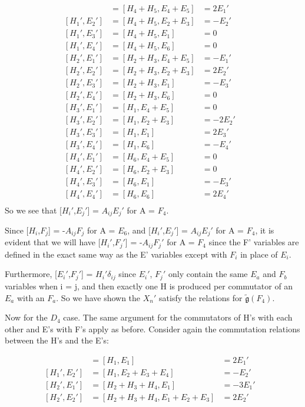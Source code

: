 \documentclass[11pt]{article}
\newcommand{\g}{\ensuremath{\mathfrak{g}}}
\begin{document}
\begin{align*}
[H_1',E_1'] &= [H_4+H_5,E_4+E_5] &= 2E_1'&\\
[H_1',E_2'] &= [H_4+H_5,E_2+E_3] &= -E_2'&\\
[H_1',E_3'] &= [H_4+H_5,E_1] &= 0&\\
[H_1',E_4'] &= [H_4+H_5,E_6] &= 0&\\
[H_2',E_1'] &= [H_2+H_3,E_4+E_5] &= -E_1'&\\
[H_2',E_2'] &= [H_2+H_3,E_2+E_3] &= 2E_2'&\\
[H_2',E_3'] &= [H_2+H_3,E_1] &= -E_3'&\\
[H_2',E_4'] &= [H_2+H_3,E_6] &= 0&\\
[H_3',E_1'] &= [H_1,E_4+E_5] &= 0&\\
[H_3',E_2'] &= [H_1,E_2+E_3] &= -2E_2'&\\
[H_3',E_3'] &= [H_1,E_1] &= 2E_3'&\\
[H_3',E_4'] &= [H_1,E_6] &= -E_4'&\\
[H_4',E_1'] &= [H_6,E_4+E_5] &= 0&\\
[H_4',E_2'] &= [H_6,E_2+E_3] &= 0&\\
[H_4',E_3'] &= [H_6,E_1] &= -E_3'&\\
[H_4',E_4'] &= [H_6,E_6] &= 2E_4'&\\
\end{align*}
So we see that [$H_i'$,$E_j'$] = $A_{i j}E_j'$ for A = $F_4$.

Since [$H_i$,$F_j$] = -$A_{i j}F_j$ for A = $E_6$, and [$H_i'$,$E_j'$] = $A_{i j}E_j'$ for A = $F_4$, it is evident that we will have [$H_i'$,$F_j'$] = -$A_{i j}F_j'$ for A = $F_4$ since the F' variables are defined in the exact same way as the E' variables except with $F_i$ in place of $E_i$.

Furthermore, [$E_i'$,$F_j'$] = $H_i' \delta_{i j}$ since $E_i'$, $F_j'$ only contain the same $E_a$ and $F_b$ variables when i = j, and then exactly one H is produced per commutator of an $E_a$ with an $F_a$.  So we have shown the {$X_n'$} satisfy the relations for $\tilde{\g}(F_4)$.

Now for the $D_4$ case.  The same argument for the commutators of H's with each other and E's with F's apply as before. Consider again the commutation relations between the H's and the E's:

\begin{align*}
[H_1',E_1'] &= [H_1,E_1] &= 2E_1'&\\
[H_1',E_2'] &= [H_1,E_2+E_3+E_4] &= -E_2'&\\
[H_2',E_1'] &= [H_2+H_3+H_4,E_1] &= -3E_1'&\\
[H_2',E_2'] &= [H_2+H_3+H_4,E_1+E_2+E_3] &= 2E_2'&\\
\end{align*}
\end{document}
